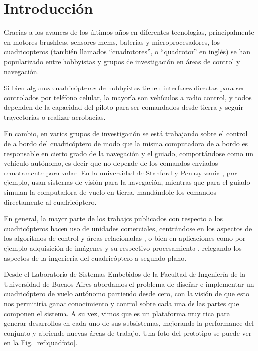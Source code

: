 \documentclass[a4paper, conference]{IEEEtran}
\begin{document}
\section{Introducción}

Gracias a los avances de los últimos años en diferentes tecnologías, principalmente en motores brushless, sensores mems, baterías y microprocesadores, los cuadricopteros (también llamados ``cuadrotores'', o ``quadrotor'' en inglés) se han popularizado entre hobbyistas y grupos de investigación en áreas de control y navegación.

Si bien algunos cuadricópteros de hobbyistas \cite{parrot} tienen interfaces directas para ser controlados por teléfono celular, la mayoría son vehículos a radio control, y todos dependen de la capacidad del piloto para ser comandados desde tierra y seguir trayectorias o realizar acrobacias. 

En cambio, en varios grupos de investigación se está trabajando sobre el control de a bordo del cuadricóptero de modo que la misma computadora de a bordo es responsable en cierto grado de la navegación y el guiado, comportándose como un vehículo autónomo, es decir que no depende de los comandos enviados remotamente para volar. En la universidad de Stanford \cite{starmac} y Pennsylvania \cite{grasp}, por ejemplo, usan sistemas de visión para la navegación, mientras que para el guiado simulan la computadora de vuelo en tierra, mandándole los comandos directamente al cuadricóptero.

En general, la mayor parte de los trabajos publicados con respecto a los cuadricópteros hacen uso de unidades comerciales, centrándose en los aspectos de los algoritmos de control y áreas relacionadas \cite{starmac} \cite{grasp}, o bien en aplicaciones como por ejemplo adquisición de imágenes y su respectivo procesamiento \cite{grasp}, relegando los aspectos de la ingeniería del cuadricóptero a segundo plano. 

Desde el Laboratorio de Sistemas Embebidos de la Facultad de Ingeniería de la Universidad de Buenos Aires abordamos el problema de diseñar e implementar un cuadricóptero de vuelo autónomo partiendo desde cero, con la visión de que esto nos permitiría ganar conocimiento y control sobre cada una de las partes que componen el sistema. A su vez, vimos que es un plataforma muy rica para generar desarrollos en cada uno de sus subsistemas, mejorando la performance del conjunto y abriendo nuevas áreas de trabajo. Una foto del prototipo se puede ver en la Fig. \ref{ref:quadfoto}.
\end{document}
